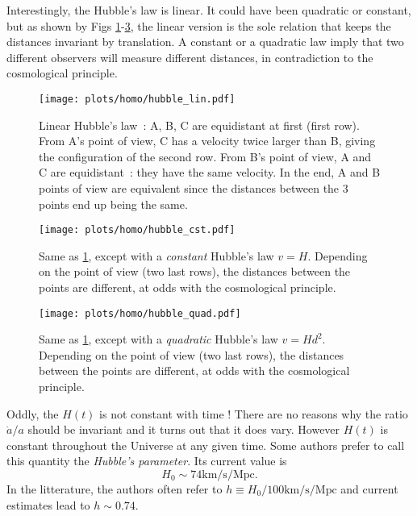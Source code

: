 Interestingly, the Hubble's law is linear. It could have been quadratic or constant, but as shown by Figs \ref{fig:plots_homo_hubble_lin}-\ref{fig:plots_homo_hubble_quad}, the linear version is the sole relation that keeps the distances invariant by translation. A constant or a quadratic law imply that two different observers will measure different distances, in contradiction to the cosmological principle.

\begin{figure}[htbp]
	\centering
		\texttt{[image: plots/homo/hubble\_lin.pdf]}
	\caption{Linear Hubble's law~: A, B, C are equidistant at first (first row). From A's point of view, C has a velocity twice larger than B, giving the configuration of the second row. From B's point of view, A and C are equidistant~: they have the same velocity. In the end, A and B points of view are equivalent since the distances between the 3 points end up being the same.}
	\label{fig:plots_homo_hubble_lin}
\end{figure}


\begin{figure}[htbp]
	\centering
		\texttt{[image: plots/homo/hubble\_cst.pdf]}
	\caption{Same as \ref{fig:plots_homo_hubble_lin}, except with a \emph{constant} Hubble's law $v=H$. Depending on the point of view (two last rows), the distances between the points are different, at odds with the cosmological principle.}
	\label{fig:plots_homo_hubble_cst}
\end{figure}


\begin{figure}[htbp]
	\centering
		\texttt{[image: plots/homo/hubble\_quad.pdf]}
	\caption{Same as \ref{fig:plots_homo_hubble_lin}, except with a \emph{quadratic} Hubble's law $v=Hd^2$. Depending on the point of view (two last rows), the distances between the points are different, at odds with the cosmological principle.}
	\label{fig:plots_homo_hubble_quad}
\end{figure}


Oddly, the $H(t)$ is not constant with time ! There are no reasons why the ratio $\dot a/a$ should be invariant and it turns out that it does vary. However $H(t)$ is constant throughout the Universe at any given time. Some authors prefer to call this quantity the \emph{Hubble's parameter}. Its current value is 
\begin{equation}
	H_0\sim74\mathrm{km/s/Mpc}.
\end{equation}
In the litterature, the authors often refer to $h\equiv H_0/100\mathrm{km/s/Mpc}$ and current estimates lead to $h\sim0.74$. 

